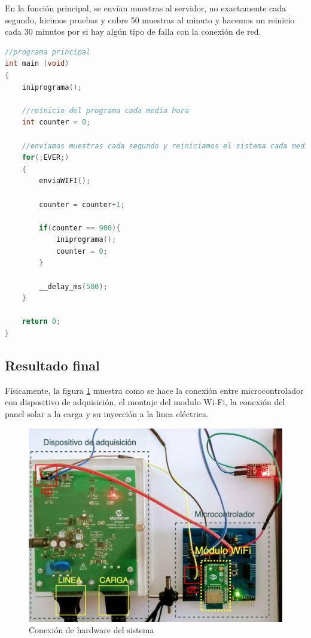 En la función principal, se envían muestras al servidor, no exactamente cada segundo, hicimos pruebas y cubre 50 muestras al minuto y hacemos un reinicio cada 30 minutos por si hay algún tipo de falla con la conexión de red.

\begin{lstlisting}[language=C]
//programa principal
int main (void)
{     
    iniprograma();

    //reinicio del programa cada media hora
    int counter = 0;
    
    //enviamos muestras cada segundo y reiniciamos el sistema cada media hora
    for(;EVER;)
    {           
        enviaWIFI();
        
        counter = counter+1;
        
        if(counter == 900){
            iniprograma();
            counter = 0;
        }
        
        __delay_ms(500);
    }
    
    return 0;
}
\end{lstlisting}

\subsection{Resultado final}

Físicamente, la figura \ref{fig:conexion hardware} muestra como se hace la conexión entre microcontrolador con dispositivo de adquisición, el montaje del modulo Wi-Fi, la conexión del panel solar a la carga y su inyección a la linea eléctrica.
    
\begin{figure}[H]
	\centering
	\includegraphics[scale=.3]{Capitulo5/images/conexion_fisica.png}
	\caption{Conexión de hardware del sistema}
	\label{fig:conexion hardware}
\end{figure} 

